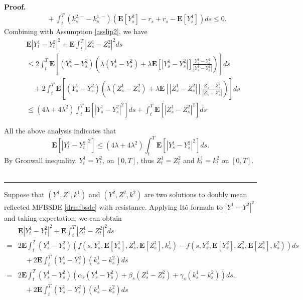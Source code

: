 \documentclass[10pt]{article}%
\numberwithin{equation}{section}
\newenvironment{proof}[1][Proof]{\noindent \textbf{#1.} }{\  \rule{0.5em}{0.5em}}
\begin{document}
\begin{proof}
\begin{equation*}
\begin{split}
           &\quad+\int_{t}^{T}(k_s^{2,-}-k_s^{1,-})(\mathbf{E}[Y^2_s]-r_s+r_s-\mathbf{E}[Y^1_s])ds \leq 0.
      \end{split}
  \end{equation*}
       Combining with Assumption \ref{asslip2}, we have 
\begin{equation}
    \begin{split}
      & \mathbf{E}\left|Y_t^1-Y_t^2\right|^2+\mathbf{E}\int_{t}^{T}\left|Z_s^1-Z_s^2\right|^2ds\\
      &\leq 2\int_{t}^{T} \mathbf{E}[(Y^1_s-Y^2_s)(\lambda(Y^1_s-Y^2_s)+\lambda\mathbf{E}[\left|Y_s^1-Y_s^2\right|]\frac{Y_s^1-Y_s^2}{\left|Y_s^1-Y_s^2\right|})]ds\\
      &\quad +2 \int_{t}^{T}\mathbf{E}[(Y^1_s-Y^2_s)(\lambda(Z^1_s-Z^2_s)+\lambda\mathbf{E}[\left|Z_s^1-Z_s^2\right|]\frac{Z_s^1-Z_s^2}{\left|Z_s^1-Z_s^2\right|})]ds\\
      &\leq (4\lambda+4\lambda^2) \int_{t}^{T} \mathbf{E}[\left|Y_s^1-Y_s^2\right|^2]ds+\int_{t}^{T} \mathbf{E}[\left|Z_s^1-Z_s^2\right|^2]ds
    \end{split}
\end{equation} 
  
All the above analysis indicates that 
\begin{equation*}  
\mathbf{E}\left[|Y_t^1-Y_t^2|^2\right]\leq (4\lambda+4\lambda^2)\int_{t}^{T}\mathbf{E}\left[|Y_s^1-Y_s^2|^2\right]ds.
\end{equation*}
By Gronwall inequality, $Y^1_t=Y^2_t$, on $[0,T]$, thus $Z^1_t=Z^2_t$ and $k^1_t=k^2_t$ on $[0,T]$.
\end{proof}
 Suppose that $(Y^1,Z^1,k^1)$ and $(Y^2,Z^2,k^2)$ are two solutions to doubly mean reflected MFBSDE  \eqref{drmfbsde} {\color{red}with resistance}.
    Applying It\^o formula to $\left|Y^1-Y^2\right|^2$ and taking expectation, we can obtain 
    \begin{equation}
    \begin{split}
      & \mathbf{E}\left|Y_t^1-Y_t^2\right|^2+\mathbf{E}\int_{t}^{T}\left|Z_t^1-Z_t^2\right|^2ds\\
      =&2\mathbf{E}\int_{t}^{T}(Y^1_s-Y^2_s)(f(s,Y_s^1,\mathbf{E}[Y_s^1],Z_s^1,\mathbf{E}[Z_s^1],k_s^1)-f(s,Y_s^2,\mathbf{E}[Y_s^2],Z_s^2,\mathbf{E}[Z_s^1],k_s^2))ds\\
      &\quad+2\mathbf{E}\int_{t}^{T}(Y^1_s-Y^2_s)(k_s^1-k_s^2)ds\\
      =&2\mathbf{E}\int_{t}^{T}(Y^1_s-Y^2_s)(\alpha_s(Y_s^1-Y_s^2)+\beta_s(Z_s^1-Z_s^2)+\gamma_s(k_s^1-k_s^2))ds.\\
      &\quad+2\mathbf{E}\int_{t}^{T}(Y^1_s-Y^2_s)(k_s^1-k_s^2)ds\\
    \end{split}
    \end{equation}
\end{document}
